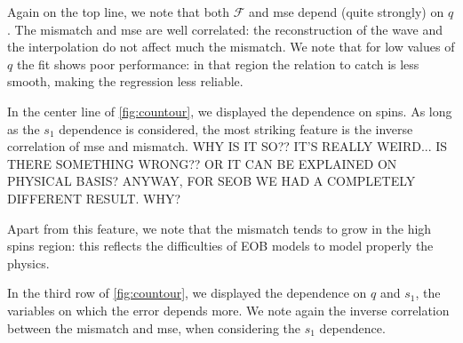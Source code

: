 \par
Again on the top line, we note that both $\mathcal{F}$ and mse depend (quite strongly) on $q$.
The mismatch and mse are well correlated: the reconstruction of the wave and the interpolation do not affect much the mismatch.
We note that for low values of $q$ the fit shows poor performance: in that region the relation to catch is less smooth, making the regression less reliable.
\par
In the center line of \ref{fig:countour}, we displayed the dependence on spins.
As long as the $s_1$ dependence is considered, the most striking feature is the inverse correlation of mse and mismatch. WHY IS IT SO?? IT'S REALLY WEIRD... IS THERE SOMETHING WRONG?? OR IT CAN BE EXPLAINED ON PHYSICAL BASIS? ANYWAY, FOR SEOB WE HAD A COMPLETELY DIFFERENT RESULT. WHY?
\par
Apart from this feature, we note that the mismatch tends to grow in the high spins region: this reflects the difficulties of EOB models to model properly the physics. 
\par
In the third row of \ref{fig:countour}, we displayed the dependence on $q$ and $s_1$, the variables on which the error depends more.
We note again the inverse correlation between the mismatch and mse, when considering the $s_1$ dependence.
